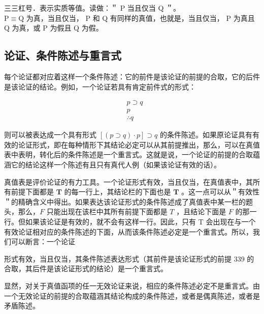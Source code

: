 三三杠号．表示实质等值。读做：＂ P 当且仅当 Q ＂。\\
$\mathrm{P} \equiv \mathrm{Q}$ 为真，当且仅当， P 和 Q 有同样的真值，也就是，当且仅当， P 为真且 Q 为真，或 P 为假且 Q 为假。

\subsection{论证、条件陈述与重言式}
每个论证都对应着这样一个条件陈述：它的前件是该论证的前提的合取，它的后件是该论证的结论。例如，一个论证若具有肯定前件式的形式：

$$
\begin{aligned}
& p \supset q \\
& p \\
& \therefore q
\end{aligned}
$$

则可以被表达成一个具有形式 $[(p \supset q) \cdot p] \supset q$ 的条件陈述。如果原论证具有有效的论证形式，即在每种情形下其结论必定可以从其前提推出，那么，可以在真值表中表明，转化后的条件陈述是一个重言式。这就是说，一个论证的前提的合取蕴涵它的结论这样一个陈述有且只有真代人例（如果该论证有效的话）。

真值表是评价论证的有力工具。一个论证形式有效，当且仅当，在真值表中，其所有前提下面都是 $\mathbf{T}$ 的每一行上，其结论栏的下面也是 $\mathbf{T}$ 。这一点可以从＂有效性＂的精确含义中得出。如果表达该论证形式的条件陈述成了真值表中某一栏的题头，那么，$F$ 只能出现在该栏中其所有前提下面都是 $T$ ，且结论下面是 $F$ 的那一行。但如果该论证是有效的，就不会有这样一行。因此，只有 T 会出现在与一个有效论证相对应的条件陈述的下面，从而该条件陈述必定是一个重言式。所以，我们可以断言：一个论证

形式有效，当且仅当，其条件陈述表达形式（其前件是该论证形式的前提 339 的合取，其后件是该论证形式的结论）是一个重言式。

显然，对关于真值函项的任一无效论证来说，相应的条件陈述必定不是重言式。由一个无效论证的前提的合取蕴涵其结论构成的条件陈述，或者是偶真陈述，或者是矛盾陈述。 

